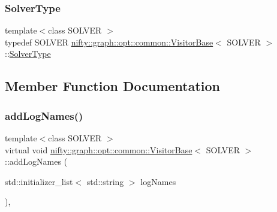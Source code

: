 \subsubsection{\texorpdfstring{Solver\+Type}{SolverType}}
{\footnotesize\ttfamily template$<$class S\+O\+L\+V\+ER $>$ \\
typedef S\+O\+L\+V\+ER \hyperlink{classnifty_1_1graph_1_1opt_1_1common_1_1VisitorBase}{nifty\+::graph\+::opt\+::common\+::\+Visitor\+Base}$<$ S\+O\+L\+V\+ER $>$\+::\hyperlink{classnifty_1_1graph_1_1opt_1_1common_1_1VisitorBase_a433d03139897d4aefe27315b2bbb3adc}{Solver\+Type}}



\subsection{Member Function Documentation}
\mbox{\label{classnifty_1_1graph_1_1opt_1_1common_1_1VisitorBase_acc4f1b419303965b0313ca83c6a7a420}} 
\subsubsection{\texorpdfstring{add\+Log\+Names()}{addLogNames()}}
{\footnotesize\ttfamily template$<$class S\+O\+L\+V\+ER $>$ \\
virtual void \hyperlink{classnifty_1_1graph_1_1opt_1_1common_1_1VisitorBase}{nifty\+::graph\+::opt\+::common\+::\+Visitor\+Base}$<$ S\+O\+L\+V\+ER $>$\+::add\+Log\+Names (\begin{DoxyParamCaption}\item[{std\+::initializer\+\_\+list$<$ std\+::string $>$}]{log\+Names }\end{DoxyParamCaption})\hspace{0.3cm}{\ttfamily [inline]}, {\ttfamily [virtual]}}



